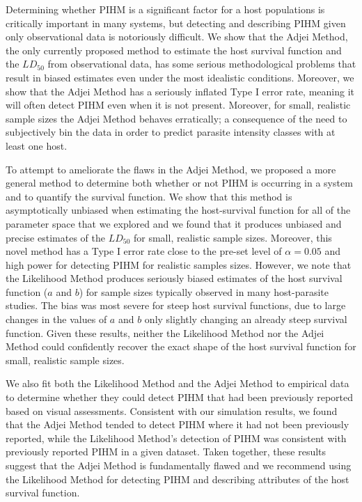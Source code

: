 \documentclass[12pt, a4paper]{article}
\begin{document}
Determining whether PIHM is a significant factor for a host populations is
critically important in many systems, but detecting and describing PIHM given
only observational data is notoriously difficult.  We show that the Adjei
Method, the only currently proposed method to estimate the host survival
function and the $LD_{50}$ from observational data, has some serious
methodological problems that result in biased estimates even under the most idealistic conditions.
Moreover, we show that the Adjei Method has a seriously inflated Type I error
rate, meaning it will often detect PIHM even when it is not present. Moreover,
for small, realistic sample sizes the Adjei Method behaves erratically; a
consequence of the need to subjectively bin the data in order to predict
parasite intensity classes with at least one host.

To attempt to ameliorate the flaws in the Adjei Method, we proposed a more
general method to determine both whether or not PIHM is occurring in a system
and to quantify the survival function.  We show that this method is
asymptotically unbiased when estimating the host-survival function for all of
the parameter space that we explored and we found that it produces unbiased and
precise estimates of the $LD_{50}$ for small, realistic sample sizes. Moreover,
this novel method has a Type I error rate close to the pre-set level of $\alpha = 0.05$ and high power for detecting PIHM for realistic samples sizes.
  However, we note that
the Likelihood Method produces seriously biased estimates of the host survival
function ($a$ and $b$) for sample sizes typically observed in many host-parasite studies.  The bias was most severe for steep host survival functions,
due to large changes in the values of $a$ and $b$ only slightly changing an
already steep survival function.  Given these results, neither the
Likelihood Method nor the Adjei Method could confidently recover the exact shape of the host survival function for small, realistic sample sizes.

We also fit both the Likelihood Method and the Adjei Method to empirical data to
determine whether they could detect PIHM that had been previously reported
based on visual assessments.  Consistent with our simulation results, we found
that the Adjei Method tended to detect PIHM where it had not been previously
reported, while the Likelihood Method's detection of PIHM was consistent with
previously reported PIHM in a given dataset.  Taken together, these results suggest that the Adjei Method is fundamentally
flawed and we recommend using the Likelihood Method for detecting PIHM and describing attributes of the host survival function.
\end{document}

